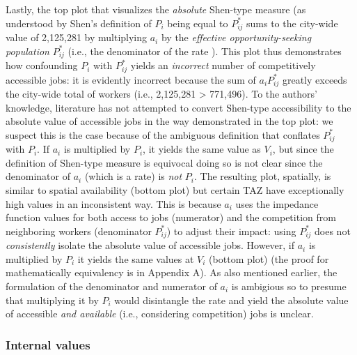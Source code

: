 \documentclass[10pt,letterpaper]{article}
\begin{document}
Lastly, the top plot that visualizes the \emph{absolute} Shen-type
measure (as understood by Shen's definition of \(P_i\) being equal to
\(P_{ij}^*\) sums to the city-wide value of 2,125,281 by multiplying
\(a_i\) by the \emph{effective opportunity-seeking population}
\(P_{ij}^*\) (i.e., the denominator of the rate ). This plot thus
demonstrates how confounding \(P_i\) with \(P_{ij}^*\) yields an
\emph{incorrect} number of competitively accessible jobs: it is
evidently incorrect because the sum of \(a_iP_{ij}^*\) greatly exceeds
the city-wide total of workers (i.e., 2,125,281 \textgreater{} 771,496).
To the authors' knowledge, literature has not attempted to convert
Shen-type accessibility to the absolute value of accessible jobs in the
way demonstrated in the top plot: we suspect this is the case because of
the ambiguous definition that conflates \(P_{ij}^*\) with \(P_i\). If
\(a_i\) is multiplied by \(P_i\), it yields the same value as \(V_i\),
but since the definition of Shen-type measure is equivocal doing so is
not clear since the denominator of \(a_i\) (which is a rate) is
\emph{not} \(P_i\). The resulting plot, spatially, is similar to spatial
availability (bottom plot) but certain TAZ have exceptionally high
values in an inconsistent way. This is because \(a_i\) uses the
impedance function values for both access to jobs (numerator) and the
competition from neighboring workers (denominator \(P_{ij}^*\)) to
adjust their impact: using \(P_{ij}^*\) does not \emph{consistently}
isolate the absolute value of accessible jobs. However, if \(a_i\) is
multiplied by \(P_i\) it yields the same values at \(V_i\) (bottom plot)
(the proof for mathematically equivalency is in Appendix A). As also
mentioned earlier, the formulation of the denominator and numerator of
\(a_i\) is ambigious so to presume that multiplying it by \(P_i\) would
disintangle the rate and yield the absolute value of accessible
\emph{and available} (i.e., considering competition) jobs is unclear.

\hypertarget{internal-values}{%
\subsubsection{Internal values}\label{internal-values}}
\end{document}
